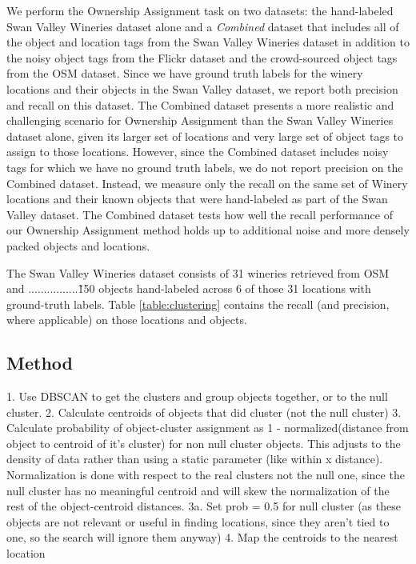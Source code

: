 We perform the Ownership Assignment task on two datasets: the hand-labeled Swan Valley Wineries dataset alone and a \textit{Combined} dataset that includes all of the object and location tags from the Swan Valley Wineries dataset in addition to the noisy object tags from the Flickr dataset and the crowd-sourced object tags from the OSM dataset.
Since we have ground truth labels for the winery locations and their objects in the Swan Valley dataset, we report both precision and recall on this dataset.
The Combined dataset presents a more realistic and challenging scenario for Ownership Assignment than the Swan Valley Wineries dataset alone, given its larger set of locations and very large set of object tags to assign to those locations. However, since the Combined dataset includes noisy tags for which we have no ground truth labels, we do not report precision on the Combined dataset. Instead, we measure only the recall on the same set of Winery locations and their known objects that were hand-labeled as part of the Swan Valley dataset. The Combined dataset tests how well the recall performance of our Ownership Assignment method holds up to additional noise and more densely packed objects and locations.

The Swan Valley Wineries dataset consists of 31 wineries retrieved from OSM and ................\~150 objects hand-labeled across 6 of those 31 locations with ground-truth labels. Table \ref{table:clustering} contains the recall (and precision, where applicable) on those locations and objects.


\subsection{Method}
1. Use DBSCAN to get the clusters and group objects together, or to the null cluster.
2. Calculate centroids of objects that did cluster (not the null cluster)
3. Calculate probability of object-cluster assignment as 1 - normalized(distance from object to centroid of it's cluster) for non null cluster objects. This adjusts to the density of data rather than using a static parameter (like within x distance). Normalization is done with respect to the real clusters not the null one, since the null cluster has no meaningful centroid and will skew the normalization of the rest of the object-centroid distances.
3a. Set prob = 0.5 for null cluster (as these objects are not relevant or useful in finding locations, since they aren't tied to one, so the search will ignore them anyway)
4. Map the centroids to the nearest location


